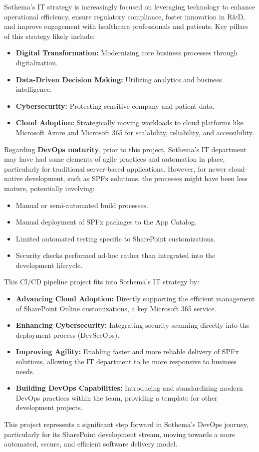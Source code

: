 Sothema's IT strategy is increasingly focused on leveraging technology to enhance operational efficiency, ensure regulatory compliance, foster innovation in R\&D, and improve engagement with healthcare professionals and patients. Key pillars of this strategy likely include:
\begin{itemize}
    \item \textbf{Digital Transformation:} Modernizing core business processes through digitalization.
    \item \textbf{Data-Driven Decision Making:} Utilizing analytics and business intelligence.
    \item \textbf{Cybersecurity:} Protecting sensitive company and patient data.
    \item \textbf{Cloud Adoption:} Strategically moving workloads to cloud platforms like Microsoft Azure and Microsoft 365 for scalability, reliability, and accessibility.
\end{itemize}

Regarding \textbf{DevOps maturity}, prior to this project, Sothema's IT department may have had some elements of agile practices and automation in place, particularly for traditional server-based applications. However, for newer cloud-native development, such as SPFx solutions, the processes might have been less mature, potentially involving:
\begin{itemize}
    \item Manual or semi-automated build processes.
    \item Manual deployment of SPFx packages to the App Catalog.
    \item Limited automated testing specific to SharePoint customizations.
    \item Security checks performed ad-hoc rather than integrated into the development lifecycle.
\end{itemize}

This CI/CD pipeline project fits into Sothema's IT strategy by:
\begin{itemize}
    \item \textbf{Advancing Cloud Adoption:} Directly supporting the efficient management of SharePoint Online customizations, a key Microsoft 365 service.
    \item \textbf{Enhancing Cybersecurity:} Integrating security scanning directly into the deployment process (DevSecOps).
    \item \textbf{Improving Agility:} Enabling faster and more reliable delivery of SPFx solutions, allowing the IT department to be more responsive to business needs.
    \item \textbf{Building DevOps Capabilities:} Introducing and standardizing modern DevOps practices within the team, providing a template for other development projects.
\end{itemize}

This project represents a significant step forward in Sothema's DevOps journey, particularly for its SharePoint development stream, moving towards a more automated, secure, and efficient software delivery model.